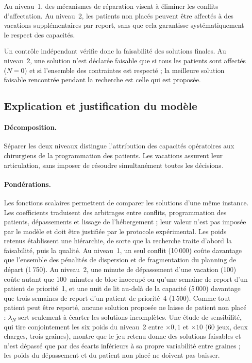 \documentclass[11pt,a4paper]{article}
\begin{document}
Au niveau~1, des mécanismes de réparation visent à éliminer
les conflits d'affectation. Au niveau~2, les patients non
placés peuvent être affectés à des vacations supplémentaires
par report, sans que cela garantisse systématiquement
le respect des capacités.

Un contrôle indépendant vérifie donc la faisabilité des
solutions finales. Au niveau~2, une solution n'est déclarée
faisable que si tous les patients sont affectés ($N=0$)
et si l'ensemble des contraintes est respecté ; la meilleure
solution faisable rencontrée pendant la recherche est
celle qui est proposée.


\subsection{Explication et justification du modèle}

\paragraph{Décomposition.}
Séparer les deux niveaux distingue l'attribution des capacités opératoires aux chirurgiens de la programmation des patients. Les vacations assurent leur articulation, sans imposer de résoudre simultanément toutes les décisions.

\paragraph{Pondérations.}
Les fonctions scalaires permettent de comparer les solutions d'une même instance. Les coefficients traduisent des arbitrages entre conflits, programmation des patients, dépassements et lissage de l'hébergement ; leur valeur n'est pas imposée par le modèle et doit être justifiée par le protocole expérimental. Les poids retenus établissent une hiérarchie, de sorte que la recherche traite d'abord la faisabilité, puis la qualité. Au niveau~1, un seul conflit (10\,000) coûte davantage que l'ensemble des pénalités de dispersion et de fragmentation du planning de départ (1\,750). Au niveau~2, une minute de dépassement d'une vacation (100) coûte autant que 100~minutes de bloc inoccupé ou qu'une semaine de report d'un patient de priorité~1, et une nuit de lit au-delà de la capacité (5\,000) davantage que trois semaines de report d'un patient de priorité~4 (1\,500). Comme tout patient peut être reporté, aucune solution proposée ne laisse de patient non placé : $\lambda_N$ sert seulement à écarter les solutions incomplètes. Une étude de sensibilité, qui tire conjointement les six poids du niveau~2 entre $\times0{,}1$ et $\times10$ (60 jeux, deux charges, trois graines), montre que le jeu retenu donne des solutions faisables et n'est dépassé que par des écarts inférieurs à sa propre variabilité entre graines ; les poids du dépassement et du patient non placé ne doivent pas baisser.
\end{document}
